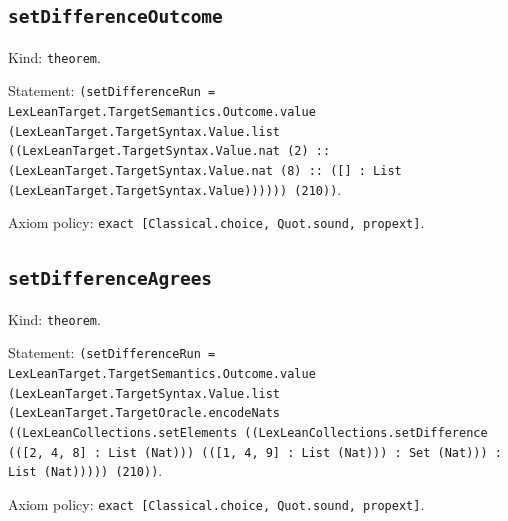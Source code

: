 \documentclass[11pt]{article}
\begin{document}
\subsection*{\texttt{setDifferenceOutcome}}
\noindent Kind: \texttt{theorem}.\par
\noindent Statement: \texttt{(setDifferenceRun = LexLeanTarget.TargetSemantics.Outcome.value (LexLeanTarget.TargetSyntax.Value.list ((LexLeanTarget.TargetSyntax.Value.nat (2) :: (LexLeanTarget.TargetSyntax.Value.nat (8) :: ([] : List (LexLeanTarget.TargetSyntax.Value)))))) (210))}.\par
\noindent Axiom policy: \texttt{exact [Classical.choice, Quot.sound, propext]}.\par
\subsection*{\texttt{setDifferenceAgrees}}
\noindent Kind: \texttt{theorem}.\par
\noindent Statement: \texttt{(setDifferenceRun = LexLeanTarget.TargetSemantics.Outcome.value (LexLeanTarget.TargetSyntax.Value.list (LexLeanTarget.TargetOracle.encodeNats ((LexLeanCollections.setElements ((LexLeanCollections.setDifference (([2, 4, 8] : List (Nat))) (([1, 4, 9] : List (Nat))) : Set (Nat))) : List (Nat))))) (210))}.\par
\noindent Axiom policy: \texttt{exact [Classical.choice, Quot.sound, propext]}.\par
\end{document}
